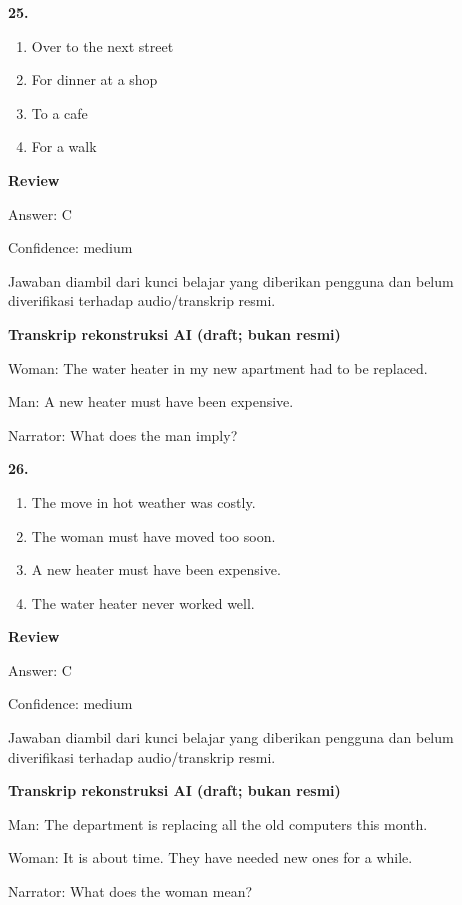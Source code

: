 \documentclass[12pt]{article}
\begin{document}
\noindent\textbf{25.}
\begin{enumerate}[label=(\Alph*),leftmargin=*,itemsep=0.2em]
\item Over to the next street
\item For dinner at a shop
\item To a cafe
\item For a walk
\end{enumerate}
\par
\begingroup
\setlength{\parskip}{0pt}
\setlength{\parindent}{0pt}
\textbf{Review}\par
Answer: C\par
Confidence: medium\par
Jawaban diambil dari kunci belajar yang diberikan pengguna dan belum diverifikasi terhadap audio/transkrip resmi.\par
\endgroup
\par
\vspace{0.25\baselineskip}
\begin{exampleblock}
\textbf{Transkrip rekonstruksi AI (draft; bukan resmi)}\par
Woman: The water heater in my new apartment had to be replaced.\par
Man: A new heater must have been expensive.\par
Narrator: What does the man imply?\par
\end{exampleblock}
\noindent\textbf{26.}
\begin{enumerate}[label=(\Alph*),leftmargin=*,itemsep=0.2em]
\item The move in hot weather was costly.
\item The woman must have moved too soon.
\item A new heater must have been expensive.
\item The water heater never worked well.
\end{enumerate}
\par
\begingroup
\setlength{\parskip}{0pt}
\setlength{\parindent}{0pt}
\textbf{Review}\par
Answer: C\par
Confidence: medium\par
Jawaban diambil dari kunci belajar yang diberikan pengguna dan belum diverifikasi terhadap audio/transkrip resmi.\par
\endgroup
\par
\vspace{0.25\baselineskip}
\begin{exampleblock}
\textbf{Transkrip rekonstruksi AI (draft; bukan resmi)}\par
Man: The department is replacing all the old computers this month.\par
Woman: It is about time. They have needed new ones for a while.\par
Narrator: What does the woman mean?\par
\end{exampleblock}
\end{document}
